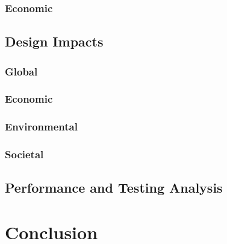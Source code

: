 \documentclass[12pt]{article}
\begin{document}
\subsubsection{Economic}


\subsection{Design Impacts}

\subsubsection{Global}

\subsubsection{Economic}

\subsubsection{Environmental}

\subsubsection{Societal}


\subsection{Performance and Testing Analysis}


\section{Conclusion}
\end{document}
